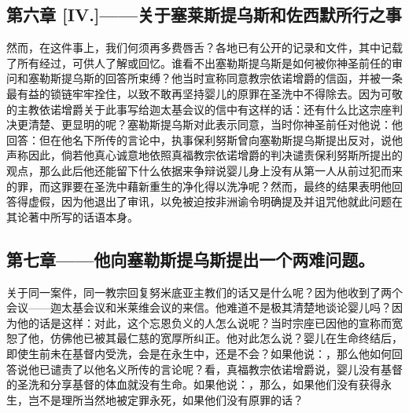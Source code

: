 
\subsection{第六章 [IV.]——关于塞莱斯提乌斯和佐西默所行之事}

然而，在这件事上，我们何须再多费唇舌？各地已有公开的记录和文件，其中记载了所有经过，可供人了解或回忆。谁看不出塞勒斯提乌斯是如何被你神圣前任的审问和塞勒斯提乌斯的回答所束缚？他当时宣称同意教宗依诺增爵的信函，并被一条最有益的锁链牢牢拴住，以致不敢再坚持婴儿的原罪在圣洗中不得除去。因为可敬的主教依诺增爵关于此事写给迦太基会议的信中有这样的话：还有什么比这宗座判决更清楚、更显明的呢？塞勒斯提乌斯对此表示同意，当时你神圣前任对他说：他回答：但在他名下所传的言论中，执事保利努斯曾向塞勒斯提乌斯提出反对，说他声称因此，倘若他真心诚意地依照真福教宗依诺增爵的判决谴责保利努斯所提出的观点，那么此后他还能留下什么依据来争辩说婴儿身上没有从第一人从前过犯而来的罪，而这罪要在圣洗中藉新重生的净化得以洗净呢？然而，最终的结果表明他回答得虚假，因为他退出了审讯，以免被迫按非洲谕令明确提及并诅咒他就此问题在其论著中所写的话语本身。\par


\subsection{第七章——他向塞勒斯提乌斯提出一个两难问题。}

关于同一案件，同一教宗回复努米底亚主教们的话又是什么呢？因为他收到了两个会议——迦太基会议和米莱维会议的来信。他难道不是极其清楚地谈论婴儿吗？因为他的话是这样：对此，这个忘恩负义的人怎么说呢？当时宗座已因他的宣称而宽恕了他，仿佛他已被其最仁慈的宽厚所纠正。他对此怎么说？婴儿在生命终结后，即使生前未在基督内受洗，会是在永生中，还是不会？如果他说：，那么他如何回答说他已谴责了以他名义所传的言论呢？看，真福教宗依诺增爵说，婴儿没有基督的圣洗和分享基督的体血就没有生命。如果他说：，那么，如果他们没有获得永生，岂不是理所当然地被定罪永死，如果他们没有原罪的话？\par

